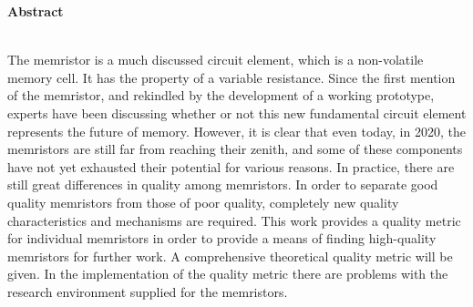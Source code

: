 \documentclass[
enabledeprecatedfontcommands, %
12pt,                  %
a4paper,               %
titlepage,             %
headsepline,
appendixprefix,        %
headings=normal,       %
parskip=half*,         %
captions=tableheading, %
chapterprefix,         %
twoside,               %
BCOR=15mm,			   %
bibliography=totoc,
numbers=noenddot,
version
]{scrbook}
\begin{document}
\vspace*{1.5cm}
\begin{LARGE}
\textbf{Abstract}
\end{LARGE}
\chapterheadstartvskip \\
The memristor is a much discussed circuit element, which is a non-volatile memory cell. It has the property of a variable resistance. Since the first mention of the memristor, and rekindled by the development of a working prototype, experts have been discussing whether or not this new fundamental circuit element represents the future of memory. However, it is clear that even today, in 2020, the memristors are still far from reaching their zenith, and some of these components have not yet exhausted their potential for various reasons. In practice, there are still great differences in quality among memristors. In order to separate good quality memristors from those of poor quality, completely new quality characteristics and mechanisms are required. This work provides a quality metric for individual memristors in order to provide a means of finding high-quality memristors for further work. A comprehensive theoretical quality metric will be given. In the implementation of the quality metric there are problems with the research environment supplied for the memristors.


\thispagestyle{empty}
\null\newpage

%

\tableofcontents{}
\thispagestyle{empty}
\null \newpage




\setcounter{page}{1}











%
%


\thispagestyle{empty}
\null \newpage

\appendix
%
\end{document}
